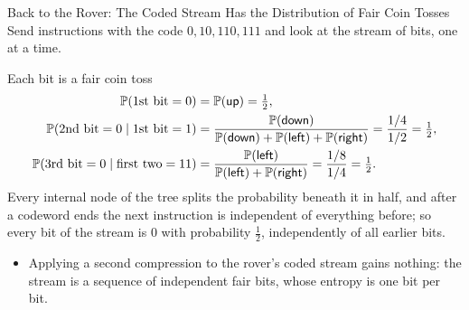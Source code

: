 \begin{frame}{Back to the Rover: The Coded Stream Has the Distribution of Fair Coin Tosses}
  \small
  Send instructions with the code $0,10,110,111$ and look at the stream of bits, one at a time.
  \begin{block}{Each bit is a fair coin toss}
    \begin{align*}
      \mathbb{P}(\text{1st bit}=0)&=\mathbb{P}(\textsf{up})=\tfrac12,\\
      \mathbb{P}(\text{2nd bit}=0\mid\text{1st bit}=1)&=\frac{\mathbb{P}(\textsf{down})}{\mathbb{P}(\textsf{down})+\mathbb{P}(\textsf{left})+\mathbb{P}(\textsf{right})}=\frac{1/4}{1/2}=\tfrac12,\\
      \mathbb{P}(\text{3rd bit}=0\mid\text{first two}=11)&=\frac{\mathbb{P}(\textsf{left})}{\mathbb{P}(\textsf{left})+\mathbb{P}(\textsf{right})}=\frac{1/8}{1/4}=\tfrac12 .
    \end{align*}
    Every internal node of the tree splits the probability beneath it in half, and after a codeword ends the next instruction is independent of everything before; so every bit of the stream is $0$ with probability $\tfrac12$, independently of all earlier bits.
  \end{block}
  \begin{itemize}
    \item Applying a second compression to the rover's coded stream gains nothing: the stream is a sequence of independent fair bits, whose entropy is one bit per bit.
  \end{itemize}
\end{frame}

